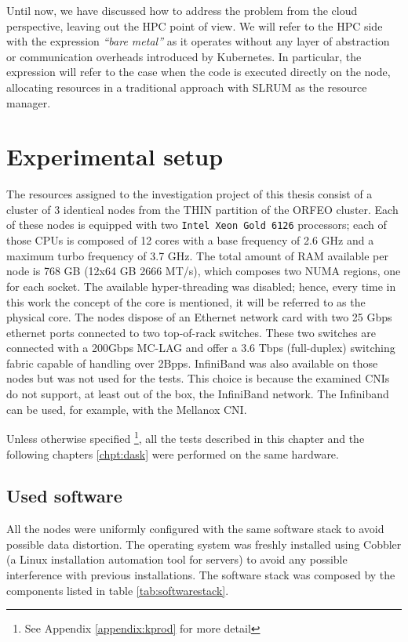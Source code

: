 Until now, we have discussed how to address the problem from the cloud
perspective, leaving out the HPC point of view. We will refer to the HPC side
with the expression \textit{``bare metal''} as it operates without any layer of
abstraction or communication overheads introduced by Kubernetes.
In particular, the expression will refer to the case when the code is executed
directly on the node, allocating resources in a traditional approach with SLRUM
\cite{Jette2023} as the resource manager.

\section{Experimental setup}
\label{sec:measurements}

The resources assigned to the investigation project of this thesis consist of a
cluster of 3 identical nodes from the THIN partition of the ORFEO cluster.
Each of these nodes is equipped with two \texttt{Intel Xeon Gold 6126}
processors; each of those CPUs is composed of 12 cores with a base frequency of
2.6 GHz and a maximum turbo frequency of 3.7 GHz.
The total amount of RAM available per node is 768 GB (12x64 GB 2666 MT/s), which
composes two NUMA regions, one for each socket.
The available hyper-threading was disabled; hence, every time in this work the
concept of the core is mentioned, it will be referred to as the physical core.
The nodes dispose of an Ethernet network card with two 25 Gbps ethernet ports
connected to two top-of-rack switches.
These two switches are connected with a  200Gbps MC-LAG and offer a 3.6 Tbps
(full-duplex) switching fabric capable of handling over 2Bpps.
InfiniBand was also available on those nodes but was not used for the tests.
This choice is because the examined CNIs do not support, at least out of the
box, the InfiniBand network.
The Infiniband can be used, for example, with the Mellanox CNI.

Unless otherwise specified \footnote{See Appendix \ref{appendix:kprod} for more
  detail}, all the tests described in this chapter and the following chapters
\ref{chpt:dask} were performed on the same hardware.

\subsection{Used software}

All the nodes were uniformly configured with the same software stack to avoid
possible data distortion. The operating system was freshly installed using
Cobbler (a Linux installation automation tool for servers) to avoid any possible
interference with previous installations.
The software stack was composed by the components listed in table
\ref{tab:softwarestack}.

